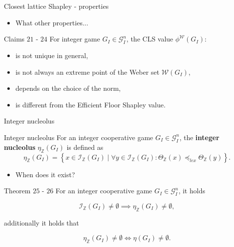 \documentclass{beamer}
\newcommand{\Z}{\mathbb{Z}}
\begin{document}
\begin{frame}{Closest lattice Shapley - properties}
    \begin{itemize}
        \item What other properties...
    \end{itemize}

    \begin{block}{Claims $21$ - $24$}
        For integer game $G_I \in \mathcal{G}_I^n$, the CLS value $\phi^\mathcal{W}(G_I)$:
        \begin{itemize}
            \item is not unique in general,
            \item is not always an extreme point of the Weber set $\mathcal{W}(G_I)$,
            \item depends on the choice of the norm,
            \item is different from the Efficient Floor Shapley value.
        \end{itemize}
    \end{block}
\end{frame}



\begin{frame}{Integer nucleolus}
    \begin{block}{Integer nucleolus}
        For an integer cooperative game $G_I \in \mathcal{G}_I^n$, the \textbf{integer nucleolus} $\eta_\Z(G_I)$ is defined as
        \begin{displaymath}
            \eta_{\Z}(G_I) = \left\{ x \in \mathcal{I}_\Z(G_I) \mid \forall y \in \mathcal{I}_\Z(G_I): \Theta_\Z(x) \preceq_{lex} \Theta_\Z(y)\right\}.
        \end{displaymath}
    \end{block}

    \begin{itemize}
        \item When does it exist?
    \end{itemize}

    \begin{block}{Theorem $25$ - $26$}
        For an integer cooperative game $G_I \in \mathcal{G}_I^n$, it holds

        \begin{displaymath}
            \mathcal{I}_{\Z}(G_I) \neq \emptyset \implies \eta_\Z(G_I) \neq \emptyset,
        \end{displaymath}

        additionally it holds that

        \begin{displaymath}
            \eta_\Z(G_I) \neq \emptyset \iff \eta(G_I) \neq \emptyset.
        \end{displaymath}
    \end{block}
\end{frame}
\end{document}
